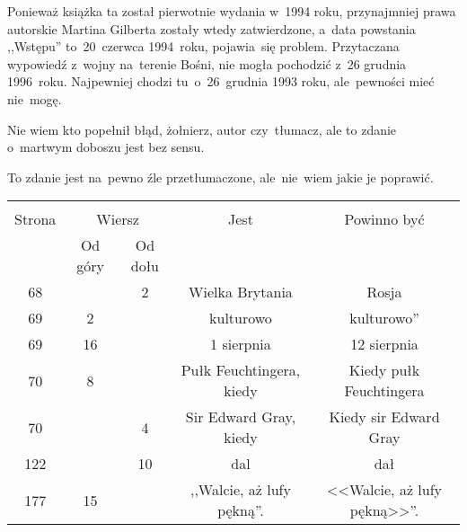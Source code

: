 \documentclass[a4paper,11pt]{article}
\begin{document}
\newpage
{}

\vspace{\spaceTwo} \vspace{\spaceThree}






\start {} Ponieważ książka ta został pierwotnie wydania
w~1994 roku, przynajmniej prawa autorskie Martina Gilberta zostały
wtedy zatwierdzone, a~data powstania ,,Wstępu'' to~20~czerwca
1994~roku, pojawia~się problem. Przytaczana wypowiedź z~wojny
na~terenie Bośni, nie mogła pochodzić z~26 grudnia 1996~roku.
Najpewniej chodzi tu~o~26~grudnia 1993 roku, ale~pewności mieć
nie~mogę.

\vspace{\spaceFour}


\start {} Nie wiem kto popełnił błąd, żołnierz, autor
czy~tłumacz, ale to zdanie o~martwym doboszu jest bez sensu.

\vspace{\spaceFour}


\start {} To zdanie jest na~pewno źle przetłumaczone,
ale~nie~wiem jakie je poprawić.


\begin{center}
  \begin{tabular}{|c|c|c|c|c|}
    \hline
    & \multicolumn{2}{c|}{} & & \\
    Strona & \multicolumn{2}{c|}{Wiersz} & Jest
                              & Powinno być \\ \cline{2-3}
    & Od góry & Od dołu & & \\
    \hline
    68  & &  2 & Wielka Brytania & Rosja \\
    69  &  2 & & kulturowo & kulturowo'' \\
    69  & 16 & & 1 sierpnia & 12 sierpnia \\
    70  &  8 & & Pułk Feuchtingera, kiedy & Kiedy pułk Feuchtingera \\
    70  & &  4 & Sir Edward Gray, kiedy & Kiedy sir Edward Gray \\
    122 & & 10 & dal & dał \\
    177 & 15 & & ,,Walcie, aż lufy pękną''.
           & <<Walcie, aż lufy pękną>>''. \\
    \hline
  \end{tabular}
\end{center}
\end{document}
